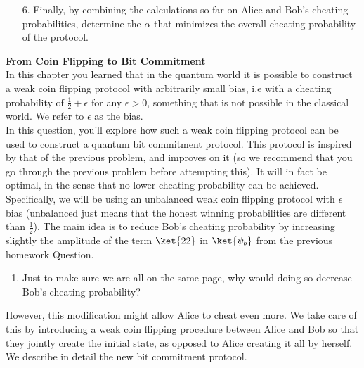 \begin{exercises}
\begin{enumerate}
\item[6.] Finally, by combining the calculations so far on Alice and Bob's cheating probabilities, determine the $\alpha$ that minimizes the overall cheating probability of the protocol.
\end{enumerate}


\item {\bf From Coin Flipping to Bit Commitment}\\
In this chapter you learned that in the quantum world it is possible to construct a weak coin flipping protocol with arbitrarily small bias, i.e with a cheating probability of  $\frac{1}{2}+\epsilon$ for any $\epsilon > 0$, something that is not possible in the classical world. We refer to $\epsilon$ as the bias. \\
In this question, you'll explore how such a weak coin flipping protocol can be used to construct a quantum bit commitment protocol. This protocol is inspired by that of the previous problem, and improves on it (so we recommend that you go through the previous problem before attempting this). It will in fact be optimal, in the sense that no lower cheating probability can be achieved. Specifically, we will be using an unbalanced weak coin flipping protocol with $\epsilon$ bias (unbalanced just means that the honest winning probabilities are different than $\frac{1}{2}$).
The main idea is to reduce Bob's cheating probability by increasing slightly the amplitude of the term $\ket{22}$ in $\ket{\psi_b}$ from the previous homework Question. 
\begin{enumerate}
\item Just to make sure we are all on the same page, why would doing so decrease Bob's cheating probability?
\end{enumerate}
However, this modification might allow Alice to cheat even more. We take care of this by introducing a weak coin flipping procedure between Alice and Bob so that they jointly create the initial state, as opposed to Alice creating it all by herself. We describe in detail the new bit commitment protocol.

\end{exercises}
